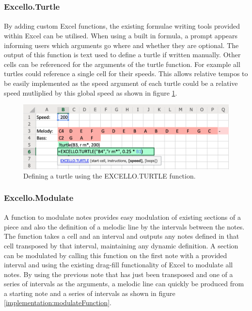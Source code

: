 \subsubsection{Excello.Turtle}

\paragraph{} By adding custom Excel functions, the existing formulae writing tools provided within Excel can be utilised. When using a built in formula, a prompt appears informing users which arguments go where and whether they are optional. The output of this function is text used to define a turtle if written manually. Other cells can be referenced for the arguments of the turtle function. For example all turtles could reference a single cell for their speeds. This allows relative tempos to be easily implemented as the speed argument of each turtle could be a relative speed mutliplied by this global speed as shown in figure \ref{implementation:turtleFunction}.

\begin{figure}[tbh]
\centerline{\includegraphics[width=150mm]{figs/turtleFunction.png}}
\caption{Defining a turtle using the EXCELLO.TURTLE function.}
\label{implementation:turtleFunction}
\end{figure}

\subsubsection{Excello.Modulate}

\paragraph{} A function to modulate notes provides easy modulation of existing sections of a piece and also the definition of a melodic line by the intervals between the notes. The function takes a cell and an interval and outputs any notes defined in that cell transposed by that interval, maintaining any dynamic definition. A section can be modulated by calling this function on the first note with a provided interval and using the existing drag-fill functionality of Excel to modulate all notes. By using the previous note that has just been transposed and one of a series of intervals as the arguments, a melodic line can quickly be produced from a starting note and a series of intervals as shown in figure \ref{implementation:modulateFunction}.

